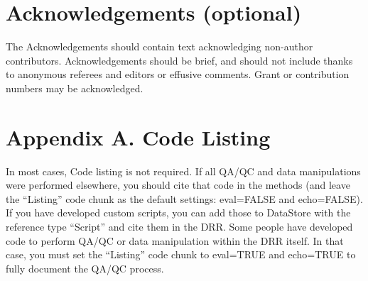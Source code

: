 \documentclass[
]{article}
\begin{document}
\hypertarget{acknowledgements-optional}{%
\section{Acknowledgements (optional)}\label{acknowledgements-optional}}

The Acknowledgements should contain text acknowledging non-author
contributors. Acknowledgements should be brief, and should not include
thanks to anonymous referees and editors or effusive comments. Grant or
contribution numbers may be acknowledged.

\hypertarget{appendix-a.-code-listing}{%
\section{Appendix A. Code Listing}\label{appendix-a.-code-listing}}

In most cases, Code listing is not required. If all QA/QC and data
manipulations were performed elsewhere, you should cite that code in the
methods (and leave the ``Listing'' code chunk as the default settings:
eval=FALSE and echo=FALSE). If you have developed custom scripts, you
can add those to DataStore with the reference type ``Script'' and cite
them in the DRR. Some people have developed code to perform QA/QC or
data manipulation within the DRR itself. In that case, you must set the
``Listing'' code chunk to eval=TRUE and echo=TRUE to fully document the
QA/QC process.
\end{document}

